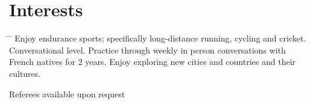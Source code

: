 \documentclass[10pt]{article} %
\begin{document}
\vspace{-5mm}
\section{Interests}

\begin{tabbing}
  \hspace{2mm} \= \hspace{18mm} \= \kill 
     {Enjoy endurance sports; specifically long-distance running, cycling and cricket.}
     {Conversational level. Practice through weekly in person conversations with French natives for 2 years.}
     {Enjoy exploring new cities and countries and their cultures.}
\end{tabbing}

\vspace{-4mm}
Referees available upon request
\end{document}
